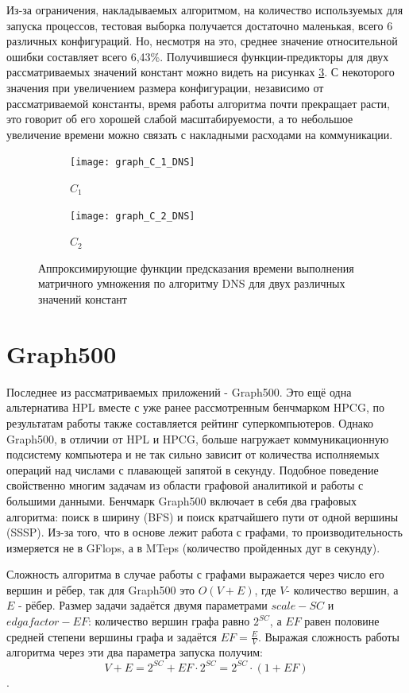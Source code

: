 			Из-за ограничения, накладываемых алгоритмом, на количество используемых для запуска процессов, тестовая выборка получается достаточно маленькая, всего 6 различных конфигураций. Но, несмотря на это, среднее значение относительной ошибки составляет всего 6,43\%. Получившиеся функции-предикторы для двух рассматриваемых значений констант можно видеть на рисунках \ref{graph_DNS}. С некоторого значения при увеличением размера конфигурации, независимо от рассматриваемой константы, время работы алгоритма почти прекращает расти, это говорит об его хорошей слабой масштабируемости, а то небольшое увеличение времени можно связать с накладными расходами на коммуникации.

			\begin{figure}
			\centering
			\begin{subfigure}{.5\textwidth}
				\centering
				\texttt{[image: graph\_C\_1\_DNS]}
				\caption{\(C_1\)}
				\label{graph_C_1_DNS}
			\end{subfigure}%
			\begin{subfigure}{.5\textwidth}
				\centering
				\texttt{[image: graph\_C\_2\_DNS]}
				\caption{\(C_2\)}
				\label{graph_C_2_DNS}
			\end{subfigure}
			\caption{Аппроксимирующие функции предсказания времени выполнения матричного умножения по алгоритму DNS для двух различных значений констант}
			\label{graph_DNS}
			\end{figure}

	\section{Graph500}
		Последнее из рассматриваемых приложений - Graph500. Это ещё одна альтернатива HPL вместе с уже ранее рассмотренным бенчмарком HPCG, по результатам работы также составляется рейтинг суперкомпьютеров. Однако Graph500, в отличии от HPL и HPCG, больше нагружает коммуникационную подсистему компьютера и не так сильно зависит от количества исполняемых операций над числами с плавающей запятой в секунду. Подобное поведение свойственно многим задачам из области графовой аналитикой и работы с большими данными. Бенчмарк Graph500 включает в себя два графовых алгоритма: поиск в ширину (BFS) и поиск кратчайшего пути от одной вершины (SSSP). Из-за того, что в основе лежит работа с графами, то производительность измеряется не в GFlops, а в MTeps (количество пройденных дуг в секунду).

		Сложность алгоритма в случае работы с графами выражается через число его вершин и рёбер, так для Graph500 это \(O(V + E)\), где \(V\)- количество вершин, а \(E\) - рёбер. Размер задачи задаётся двумя параметрами \(scale - SC\) и \(edgafactor - EF\): количество вершин графа равно \(2^{SC}\), а \(EF\) равен половине средней степени вершины графа и задаётся \(EF = \frac{E}{V}\). Выражая сложность работы алгоритма через эти два параметра запуска получим: \[V + E = 2^{SC} + EF \cdot 2^{SC} = 2^{SC} \cdot (1 + EF) \].


